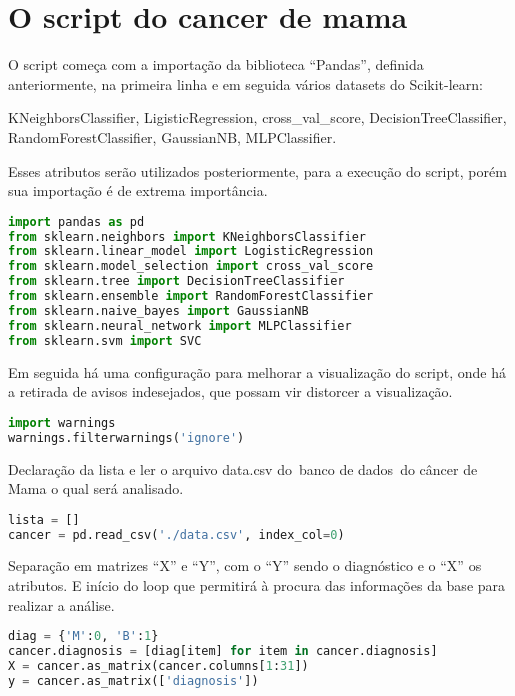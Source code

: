 \chapter{O script do cancer de mama}
\label{chapter:o_script_do_cancer_de_mama}

O script começa com a importação da biblioteca “Pandas”, definida anteriormente, na primeira linha e em seguida vários datasets do Scikit-learn: 

  KNeighborsClassifier, LigisticRegression, cross\_val\_score, DecisionTreeClassifier, RandomForestClassifier,        GaussianNB, MLPClassifier. 

Esses atributos serão utilizados posteriormente, para a execução do script, porém sua importação é de extrema importância.


\begin{lstlisting}[language=Python, caption=Importação de bibliotecas]
import pandas as pd
from sklearn.neighbors import KNeighborsClassifier
from sklearn.linear_model import LogisticRegression
from sklearn.model_selection import cross_val_score
from sklearn.tree import DecisionTreeClassifier
from sklearn.ensemble import RandomForestClassifier
from sklearn.naive_bayes import GaussianNB
from sklearn.neural_network import MLPClassifier
from sklearn.svm import SVC
\end{lstlisting}

Em seguida há uma configuração para melhorar a visualização do script, onde há a retirada de avisos indesejados, que possam vir distorcer a visualização.

\begin{lstlisting}[language=Python, caption=Ignorar Avisos]
import warnings
warnings.filterwarnings('ignore')
\end{lstlisting}

Declaração da lista e ler o arquivo data.csv do banco de dados do câncer de Mama o qual será analisado.
\begin{lstlisting}[language=Python, caption=Ler arquivo data.csv]
lista = []
cancer = pd.read_csv('./data.csv', index_col=0)
\end{lstlisting}

Separação em matrizes “X” e “Y”, com o “Y” sendo o diagnóstico e o “X” os atributos. E início do loop que permitirá à procura das informações da base para realizar a análise.
\begin{lstlisting}[language=Python, caption=Separar matrizes]
diag = {'M':0, 'B':1}
cancer.diagnosis = [diag[item] for item in cancer.diagnosis]
X = cancer.as_matrix(cancer.columns[1:31])
y = cancer.as_matrix(['diagnosis'])
\end{lstlisting}



